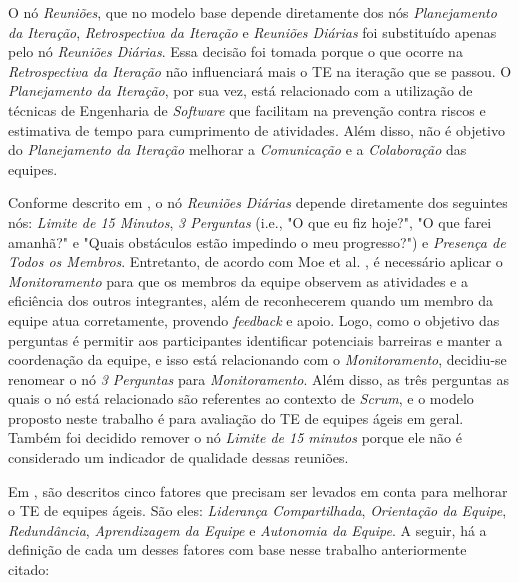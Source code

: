 O nó \textit{Reuniões}, que no modelo base depende diretamente dos nós \textit{Planejamento da Iteração}, \textit{Retrospectiva da Iteração} e \textit{Reuniões Diárias} foi substituído apenas pelo nó \textit{Reuniões Diárias}. Essa decisão foi tomada porque o que ocorre na \textit{Retrospectiva da Iteração} não influenciará mais o TE na iteração que se passou. O \textit{Planejamento da Iteração}, por sua vez, está relacionado com a utilização de técnicas de Engenharia de \textit{Software} que facilitam na prevenção contra riscos e estimativa de tempo para cumprimento de atividades. Além disso, não é objetivo do \textit{Planejamento da Iteração} melhorar a \textit{Comunicação} e a \textit{Colaboração} das equipes.

Conforme descrito em \cite{freire}, o nó \textit{Reuniões Diárias} depende diretamente dos seguintes nós: \textit{Limite de 15 Minutos}, \textit{3 Perguntas} (i.e., "O que eu fiz hoje?", "O que farei amanhã?" e "Quais obstáculos estão impedindo o meu progresso?") e \textit{Presença de Todos os Membros}. Entretanto, de acordo com Moe et al. \cite{moe2}, é necessário aplicar o \textit{Monitoramento} para que os membros da equipe observem as atividades e a eficiência dos outros integrantes, além de reconhecerem quando um membro da equipe atua corretamente, provendo \textit{feedback} e apoio. Logo, como o objetivo das perguntas é permitir aos participantes identificar potenciais barreiras e manter a coordenação da equipe, e isso está relacionando com o \textit{Monitoramento}, decidiu-se renomear o nó \textit{3 Perguntas} para \textit{Monitoramento}. Além disso, as três perguntas as quais o nó está relacionado são referentes ao contexto de \textit{Scrum}, e o modelo proposto neste trabalho é para avaliação do TE de equipes ágeis em geral. Também foi decidido remover o nó \textit{Limite de 15 minutos} porque ele não é considerado um indicador de qualidade dessas reuniões.

Em \cite{moe}, são descritos cinco fatores que precisam ser levados em conta para melhorar o TE de equipes ágeis. São eles: \textit{Liderança Compartilhada}, \textit{Orientação da Equipe}, \textit{Redundância}, \textit{Aprendizagem da Equipe} e \textit{Autonomia da Equipe}. A seguir, há a definição de cada um desses fatores com base nesse trabalho anteriormente citado:

